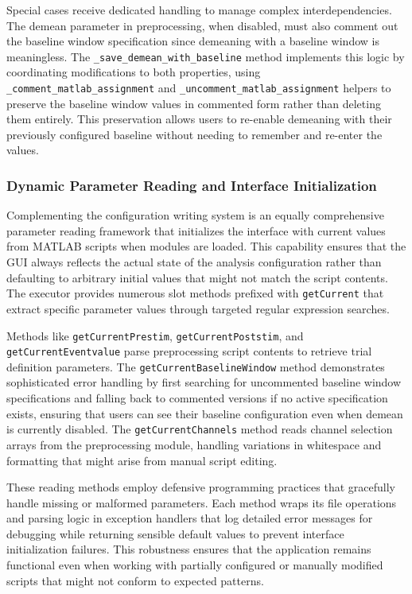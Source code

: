 \documentclass[12pt]{report}
\begin{document}
Special cases receive dedicated handling to manage complex interdependencies. The demean parameter in preprocessing, when disabled, must also comment out the baseline window specification since demeaning with a baseline window is meaningless. The \verb|_save_demean_with_baseline| method implements this logic by coordinating modifications to both properties, using \verb|_comment_matlab_assignment| and \verb|_uncomment_matlab_assignment| helpers to preserve the baseline window values in commented form rather than deleting them entirely. This preservation allows users to re-enable demeaning with their previously configured baseline without needing to remember and re-enter the values.

\subsubsection{Dynamic Parameter Reading and Interface Initialization}

Complementing the configuration writing system is an equally comprehensive parameter reading framework that initializes the interface with current values from MATLAB scripts when modules are loaded. This capability ensures that the GUI always reflects the actual state of the analysis configuration rather than defaulting to arbitrary initial values that might not match the script contents. The executor provides numerous slot methods prefixed with \verb|getCurrent| that extract specific parameter values through targeted regular expression searches.

Methods like \verb|getCurrentPrestim|, \verb|getCurrentPoststim|, and \verb|getCurrentEventvalue| parse preprocessing script contents to retrieve trial definition parameters. The \verb|getCurrentBaselineWindow| method demonstrates sophisticated error handling by first searching for uncommented baseline window specifications and falling back to commented versions if no active specification exists, ensuring that users can see their baseline configuration even when demean is currently disabled. The \verb|getCurrentChannels| method reads channel selection arrays from the preprocessing module, handling variations in whitespace and formatting that might arise from manual script editing.

These reading methods employ defensive programming practices that gracefully handle missing or malformed parameters. Each method wraps its file operations and parsing logic in exception handlers that log detailed error messages for debugging while returning sensible default values to prevent interface initialization failures. This robustness ensures that the application remains functional even when working with partially configured or manually modified scripts that might not conform to expected patterns.
\end{document}
